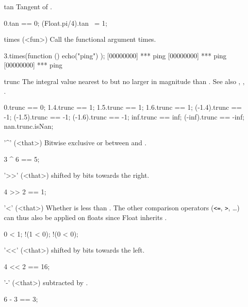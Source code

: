\begin{urbiscriptapi}
\item[tan]%
  Tangent of \this.
\begin{urbiassert}
0.tan == 0;
(Float.pi/4).tan ~= 1;
\end{urbiassert}

\item[times](<fun>)%
  Call the functional argument  \this times.

\begin{urbiscript}
3.times(function () { echo("ping") });
[00000000] *** ping
[00000000] *** ping
[00000000] *** ping
\end{urbiscript}


\item[trunc]%
  The integral value nearest to but no larger in magnitude than \this.  See
  also , , .
\begin{urbiassert}
     0.trunc ==  0;
   1.4.trunc ==  1;     1.5.trunc ==  1;    1.6.trunc ==  1;
(-1.4).trunc == -1;  (-1.5).trunc == -1; (-1.6).trunc == -1;
   inf.trunc == inf; (-inf).trunc == -inf;
   nan.trunc.isNan;
\end{urbiassert}

\item['^'](<that>)%
  Bitwise exclusive or between \this and .
\begin{urbiassert}
3 ^ 6 == 5;
\end{urbiassert}

\item['>>'](<that>)%
  \this shifted by  bits towards the right.
\begin{urbiassert}
4 >> 2 == 1;
\end{urbiassert}

\item['<'](<that>)%
  Whether \this is less than . The other comparison operators
  (\lstinline|<=|, \lstinline|>|, \ldots) can thus also be applied on floats
  since Float inherits .
\begin{urbiassert}
  0 < 1;  !(1 < 0);  !(0 < 0);
\end{urbiassert}

\item['<<'](<that>)%
  \this shifted by  bits towards the left.
\begin{urbiassert}
4 << 2 == 16;
\end{urbiassert}

\item['-'](<that>)%
  \this subtracted by .
\begin{urbiassert}
6 - 3 == 3;
\end{urbiassert}


\end{urbiscriptapi}
